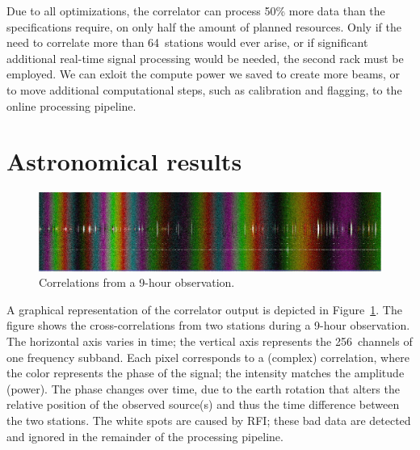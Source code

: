 \documentclass{sig-alternate}
\begin{document}

Due to all optimizations, the correlator can process 50\% more data than
the specifications require, on only half the amount of planned resources.
Only if the need to correlate more than 64~stations would ever arise, or if
significant additional real-time signal processing would be needed, the
second rack must be employed. We can exloit the compute power we saved to
create more beams, or to move additional computational steps, such as calibration and flagging,
to the online processing pipeline.


\section{Astronomical results}
\label{sec:results}

\begin{figure}[ht]
\includegraphics[width=\columnwidth]{fringe.jpg}
\caption{Correlations from a 9-hour observation.}
\label{fig:fringe}
\end{figure}

A graphical representation of the correlator output is depicted in
Figure~\ref{fig:fringe}.
The figure shows the cross-correlations from two stations during a 9-hour
observation.
The horizontal axis varies in time;
the vertical axis represents the 256~channels of one frequency subband.
Each pixel corresponds to a (complex) correlation, where the color represents
the phase of the signal; the intensity matches the amplitude (power).
The phase changes over time, due to the earth rotation that alters the
relative position of the observed source(s) and thus the time difference
between the two stations.
The white spots are caused by RFI; these bad data are detected and
ignored in the remainder of the processing pipeline.
\end{document}

